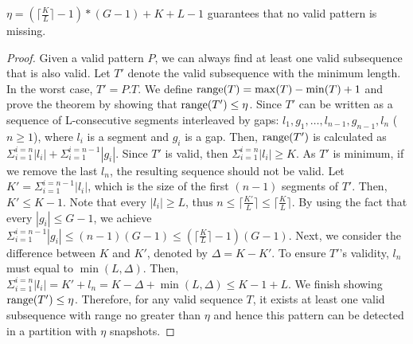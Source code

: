\begin{theorem}
\label{THM:RP_ETA}
$\eta = (\lceil \frac{K}{L} \rceil - 1)*(G-1)+K+L-1$ guarantees that no valid pattern is missing.
\end{theorem}
\begin{proof}
Given a valid pattern $P$, we can always find at least one valid subsequence that is also valid. Let $T'$ denote the valid subsequence with the minimum length. In the worst case, $T'=P.T$. We define $\operatorname*{range}(T)=\max(T) - \min(T) +1$ and prove the theorem by showing that $\operatorname*{range}(T') \leq \eta$.
Since $T'$ can be written as a sequence of L-consecutive segments interleaved by gaps: $l_1,g_1,\ldots,l_{n-1},g_{n-1},l_n$ ($n \geq 1$),
where $l_i$ is a segment and $g_i$ is a gap. Then, $\operatorname*{range}(T')$
is calculated as $\Sigma_{i=1}^{i=n}|l_i| + \Sigma_{i=1}^{i=n-1} |g_i|$. Since $T'$
is valid, then $\Sigma_{i=1}^{i=n}|l_i| \geq K$. As $T'$ is minimum, if we remove the 
last $l_n$, the resulting sequence should not be valid. Let $K' = \Sigma_{i=1}^{i=n-1}|l_i|$, which
is the size of the first $(n-1)$ segments of $T'$. Then, $K' \leq K-1$.
Note that every $|l_i| \geq L$, thus $n \leq \lceil \frac{K'}{L} \rceil \leq \lceil \frac{K}{L} \rceil $. By
using the fact that every $|g_i| \leq G-1$, we achieve $\Sigma_{i=1}^{i=n-1} |g_i| \leq (n-1)(G-1)
\leq (\lceil \frac{K}{L} \rceil -1)(G-1)$. Next, we consider the difference between $K$ and $K'$, denoted by
$\Delta = K- K'$. To ensure $T'$'s validity, $l_n$ must equal to $\min(L, \Delta)$.
Then, $\Sigma_{i=1}^{i=n}|l_i| = K' + l_n = K - \Delta + \min(L, \Delta) \leq K - 1 + L$. We finish showing $\operatorname*{range}(T') \leq \eta$.  Therefore, for any valid sequence $T$, it exists at least one valid subsequence with range no greater than $\eta$ and hence this pattern can be detected in a partition with $\eta$ snapshots.
\end{proof}



